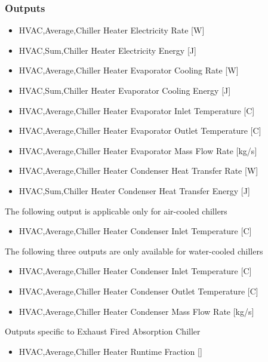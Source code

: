 \subsubsection{Outputs}\label{outputs-9-005}

\begin{itemize}
\item
  HVAC,Average,Chiller Heater Electricity Rate {[}W{]}
\item
  HVAC,Sum,Chiller Heater Electricity Energy {[}J{]}
\item
  HVAC,Average,Chiller Heater Evaporator Cooling Rate {[}W{]}
\item
  HVAC,Sum,Chiller Heater Evaporator Cooling Energy {[}J{]}
\item
  HVAC,Average,Chiller Heater Evaporator Inlet Temperature {[}C{]}
\item
  HVAC,Average,Chiller Heater Evaporator Outlet Temperature {[}C{]}
\item
  HVAC,Average,Chiller Heater Evaporator Mass Flow Rate {[}kg/s{]}
\item
  HVAC,Average,Chiller Heater Condenser Heat Transfer Rate {[}W{]}
\item
  HVAC,Sum,Chiller Heater Condenser Heat Transfer Energy {[}J{]}
\end{itemize}

The following output is applicable only for air-cooled chillers

\begin{itemize}
\tightlist
\item
  HVAC,Average,Chiller Heater Condenser Inlet Temperature {[}C{]}
\end{itemize}

The following three outputs are only available for water-cooled chillers

\begin{itemize}
\item
  HVAC,Average,Chiller Heater Condenser Inlet Temperature {[}C{]}
\item
  HVAC,Average,Chiller Heater Condenser Outlet Temperature {[}C{]}
\item
  HVAC,Average,Chiller Heater Condenser Mass Flow Rate {[}kg/s{]}
\end{itemize}

Outputs specific to Exhaust Fired Absorption Chiller

\begin{itemize}
\tightlist
\item
  HVAC,Average,Chiller Heater Runtime Fraction {[]}
\end{itemize}

